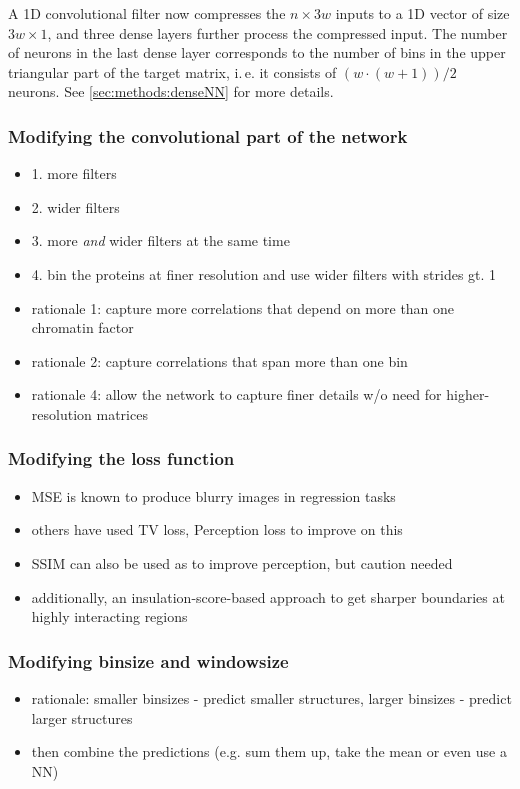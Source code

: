 A 1D convolutional filter now compresses the $n \times 3w$ inputs to a 1D vector
of size $3w \times 1$, and three dense layers further process the compressed input.
The number of neurons in the last dense layer corresponds to the number of bins
in the upper triangular part of the target matrix, i.\,e. it consists of $(w \cdot (w+1))/2$ neurons.
See \cref{sec:methods:denseNN} for more details.

\subsubsection{Modifying the convolutional part of the network}
\begin{itemize}
 \item 1. more filters
 \item 2. wider filters
 \item 3. more \emph{and} wider filters at the same time
 \item 4. bin the proteins at finer resolution and use wider filters with strides gt. 1
 \item rationale 1: capture more correlations that depend on more than one chromatin factor 
 \item rationale 2: capture correlations that span more than one bin
 \item rationale 4: allow the network to capture finer details w/o need for higher-resolution matrices
\end{itemize}

\subsubsection{Modifying the loss function}
\begin{itemize}
 \item MSE is known to produce blurry images in regression tasks
 \item others have used TV loss, Perception loss to improve on this
 \item SSIM can also be used as to improve perception, but caution needed
 \item additionally, an insulation-score-based approach to get sharper boundaries 
            at highly interacting regions
\end{itemize}

\subsubsection{Modifying binsize and windowsize}
\begin{itemize}
 \item rationale: smaller binsizes - predict smaller structures, larger binsizes - predict larger structures
 \item then combine the predictions (e.g. sum them up, take the mean or even use a NN)
\end{itemize}

